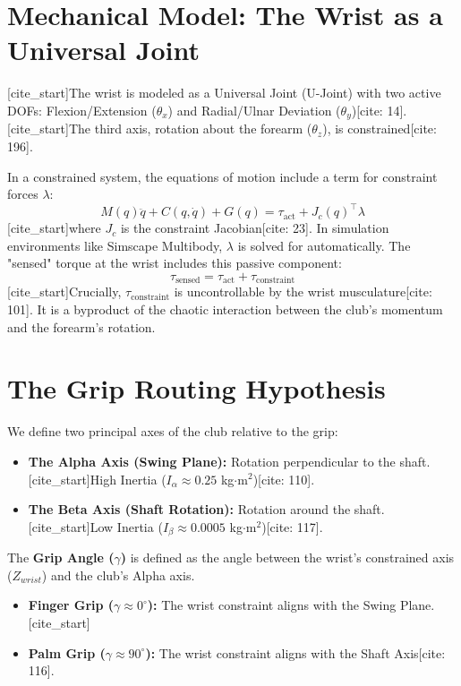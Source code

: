 \documentclass[11pt, letterpaper]{article}
\begin{document}
\section{Mechanical Model: The Wrist as a Universal Joint}

[cite_start]The wrist is modeled as a Universal Joint (U-Joint) with two active DOFs: Flexion/Extension ($\theta_x$) and Radial/Ulnar Deviation ($\theta_y$)[cite: 14]. [cite_start]The third axis, rotation about the forearm ($\theta_z$), is constrained[cite: 196].



In a constrained system, the equations of motion include a term for constraint forces $\lambda$:
\begin{equation}
    M(q)\ddot{q} + C(q,\dot{q}) + G(q) = \tau_{\text{act}} + J_c(q)^\top \lambda
    \label{eq:dyn}
\end{equation}
[cite_start]where $J_c$ is the constraint Jacobian[cite: 23]. In simulation environments like Simscape Multibody, $\lambda$ is solved for automatically. The "sensed" torque at the wrist includes this passive component:
\begin{equation}
    \tau_{\text{sensed}} = \tau_{\text{act}} + \tau_{\text{constraint}}
\end{equation}
[cite_start]Crucially, $\tau_{\text{constraint}}$ is uncontrollable by the wrist musculature[cite: 101]. It is a byproduct of the chaotic interaction between the club's momentum and the forearm's rotation.

\section{The Grip Routing Hypothesis}

We define two principal axes of the club relative to the grip:
\begin{itemize}
    \item \textbf{The Alpha Axis (Swing Plane):} Rotation perpendicular to the shaft. [cite_start]High Inertia ($I_{\alpha} \approx 0.25$ kg$\cdot$m$^2$)[cite: 110].
    \item \textbf{The Beta Axis (Shaft Rotation):} Rotation around the shaft. [cite_start]Low Inertia ($I_{\beta} \approx 0.0005$ kg$\cdot$m$^2$)[cite: 117].
\end{itemize}



The \textbf{Grip Angle ($\gamma$)} is defined as the angle between the wrist's constrained axis ($Z_{wrist}$) and the club's Alpha axis.
\begin{itemize}
    \item \textbf{Finger Grip ($\gamma \approx 0^\circ$):} The wrist constraint aligns with the Swing Plane.
    [cite_start]\item \textbf{Palm Grip ($\gamma \approx 90^\circ$):} The wrist constraint aligns with the Shaft Axis[cite: 116].
\end{itemize}
\end{document}
